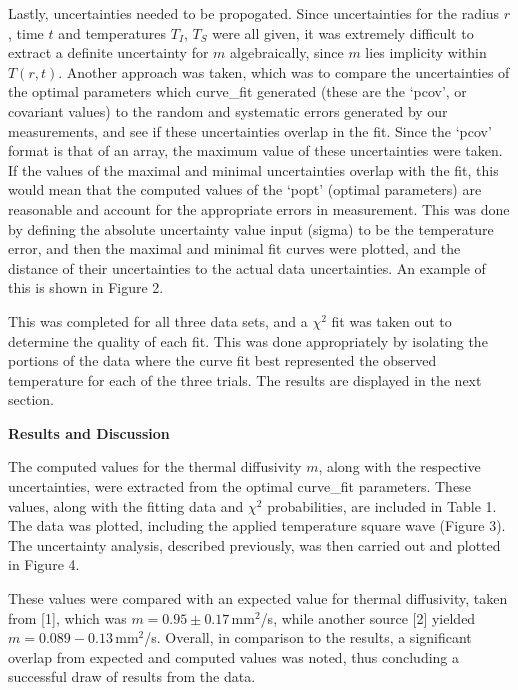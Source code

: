 \documentclass[11pt]{article}
\begin{document}
\begin{multicols}{2}
    Lastly, uncertainties needed to be propogated. Since uncertainties for the radius $r$, time $t$ and temperatures $T_I, \, T_S$ were all given, it was extremely difficult to extract a definite uncertainty for $m$ algebraically, since $m$ lies implicity within $T(r, t)$. Another approach was taken, which was to compare the uncertainties of the optimal parameters which curve\_fit generated (these are the `pcov', or covariant values) to the random and systematic errors generated by our measurements, and see if these uncertainties overlap in the fit. Since the `pcov' format is that of an array, the maximum value of these uncertainties were taken. If the values of the maximal and minimal uncertainties overlap with the fit, this would mean that the computed values of the `popt' (optimal parameters) are reasonable and account for the appropriate errors in measurement. This was done by defining the absolute uncertainty value input (sigma) to be the temperature error, and then the maximal and minimal fit curves were plotted, and the distance of their uncertainties to the actual data uncertainties. An example of this is shown in Figure 2.   

    This was completed for all three data sets, and a $\chi^2$ fit was taken out to determine the quality of each fit. This was done appropriately by isolating the portions of the data where the curve fit best represented the observed temperature for each of the three trials. The results are displayed in the next section. 







    \vspace{10pt}

     \selectfont \textbf{Results and Discussion}
    
     \selectfont The computed values for the thermal diffusivity $m$, along with the respective uncertainties, were extracted from the optimal curve\_fit parameters. These values, along with the fitting data and $\chi^2$ probabilities, are included in Table 1. The data was plotted, including the applied temperature square wave (Figure 3). The uncertainty analysis, described previously, was then carried out and plotted in Figure 4.

    These values were compared with an expected value for thermal diffusivity, taken from [1], which was $m = 0.95\pm 0.17 \,$mm$^2$/s, while another source [2] yielded\\  $m = 0.089 - 0.13\,$mm$^2$/s. Overall, in comparison to the results, a significant overlap from expected and computed values was noted, thus concluding a successful draw of results from the data. 
    

\end{multicols}
\end{document}
